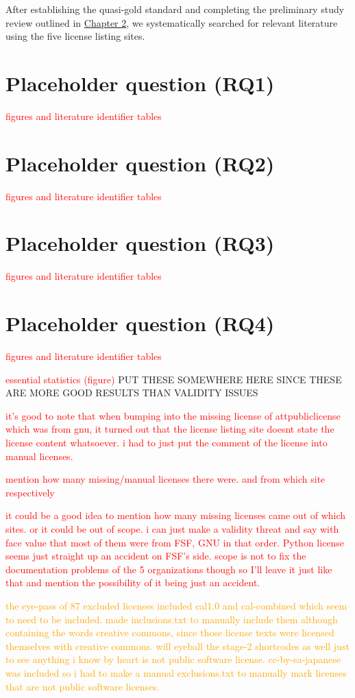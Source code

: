 After establishing the quasi-gold standard and completing the preliminary study review outlined in \hyperref[methods]{Chapter 2}, we systematically searched for relevant literature using the five license listing sites.

\section{Placeholder question (RQ1)}
\textcolor{red}{figures and literature identifier tables}
\section{Placeholder question (RQ2)}
\textcolor{red}{figures and literature identifier tables}
\section{Placeholder question (RQ3)}
\textcolor{red}{figures and literature identifier tables}
\section{Placeholder question (RQ4)}
\textcolor{red}{figures and literature identifier tables}

\textcolor{red}{essential statistics (figure)}
PUT THESE SOMEWHERE HERE SINCE THESE ARE MORE GOOD RESULTS THAN VALIDITY ISSUES 

\textcolor{red}{it's good to note that when bumping into the missing license of attpubliclicense which was from gnu, it turned out that the license listing site doesnt state the license content whatsoever. i had to just put the comment of the license into manual licenses.}

\textcolor{red}{mention how many missing/manual licenses there were. and from which site respectively}

\textcolor{red}{it could be a good idea to mention how many missing licenses came out of which sites. or it could be out of scope. i can just make a validity threat and say with face value that most of them were from FSF, GNU in that order. Python license seems just straight up an accident on FSF's side. scope is not to fix the documentation problems of the 5 organizations though so I'll leave it just like that and mention the possibility of it being just an accident.}

\textcolor{orange}{the eye-pass of 87 excluded licenses included cal1.0 and cal-combined which seem to need to be included. made inclusions.txt to manually include them although containing the words creative commons, since those license texts were licensed themselves with creative commons. will eyeball the stage-2 shortcodes as well just to see anything i know by heart is not public software license. cc-by-sa-japanese was included so i had to make a manual exclusions.txt to manually mark licenses that are not public software licenses.}

